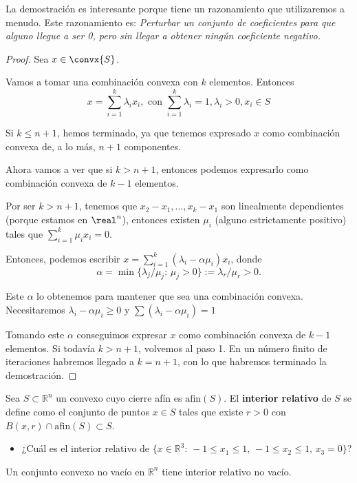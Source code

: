 La demostración es interesante porque tiene un razonamiento que utilizaremos a menudo. Este razonamiento es: \textit{Perturbar un conjunto de coeficientes para que alguno llegue a ser 0, pero sin llegar a obtener ningún coeficiente negativo.
}

\begin{proof}
Sea $x\in\convx{S}$.

Vamos a tomar una combinación convexa con $k$ elementos. Entonces \[x=\sum_{i=1}^{k}\lambda_i x_i,\text{ con } \sum_{i=1}^{k}\lambda_i=1, \lambda_i> 0, x_i\in S\]



Si $k\leq n+1$, hemos terminado, ya que tenemos expresado $x$ como combinación convexa de, a lo más, $n+1$ componentes.

Ahora vamos a ver que si $k > n+1$, entonces podemos expresarlo como combinación convexa de $k-1$ elementos.

Por ser $k>n+1$, tenemos que $x_2-x_1,\ldots, x_k-x_1$ son linealmente dependientes (porque estamos en $\real^n$), entonces existen $\mu_i$ (alguno estrictamente positivo) tales que $\displaystyle\sum_{i=1}^{k}\mu_i x_i=0$.

Entonces, podemos escribir $x=\sum_{i=1}^k (\lambda_i-\alpha\mu_i)x_i$, donde
\[
\alpha = \min\{\lambda_j/\mu_j:\, \mu_j>0\}:=\lambda_r/\mu_r > 0.
\]

Este $\alpha$ lo obtenemos para mantener que sea una combinación convexa. Necesitaremos $λ_i - \alpha μ_i \geq 0$ y $\sum (λ_i -\alpha μ_i) = 1$

Tomando este $\alpha$ conseguimos expresar $x$ como combinación convexa de $k-1$ elementos. Si todavía $k>n+1$, volvemos al paso 1. En un número finito de iteraciones habremos llegado a $k = n+1$, con lo que habremos terminado la demostración.
\end{proof}



Sea $S\subset\mathbb{R}^n$ un convexo cuyo cierre afín es $\mbox{afin}(S)$. El \textbf{interior relativo} de $S$ se define como el conjunto de puntos $x\in S$ tales que existe $r>0$ con $B(x,r)\cap \mbox{afin}(S) \subset S$.

\begin{itemize}
\item ¿Cuál es el interior relativo de $\{x\in \mathbb{R}^3:\, -1\leq x_1\leq 1,\, -1\leq x_2\leq 1,\, x_3=0\}$?
\end{itemize}



\begin{theorem}
Un conjunto convexo no vacío en $\mathbb{R}^n$ tiene interior relativo no vacío.
\end{theorem}


